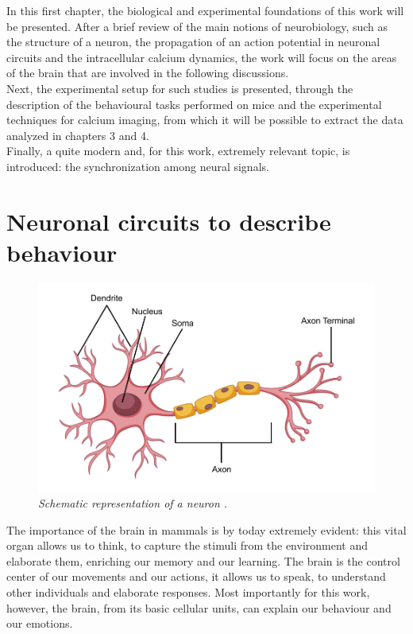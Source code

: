 \documentclass[12pt, a4paper]{report}
\begin{document}
	
	In this first chapter, the biological and experimental foundations of this work will be presented. After a brief review of the main notions of neurobiology, such as the structure of a neuron, the propagation of an action potential in neuronal circuits and the intracellular calcium dynamics, the work will focus on the areas of the brain that are involved in the following discussions.\\
	Next, the experimental setup for such studies is presented, through the description of the behavioural tasks performed on mice and the experimental techniques for calcium imaging, from which it will be possible to extract the data analyzed in chapters 3 and 4.\\
	Finally, a quite modern and, for this work, extremely relevant topic, is introduced: the synchronization among neural signals.
	
	\section{Neuronal circuits to describe behaviour} \label{first section}
	
	\begin{figure}[H]
		\begin{center}
			\includegraphics[scale=.25]{neuron.png} 
		\end{center} 
		\caption{\textit{Schematic representation of a neuron \cite{42}.}} \label{neuron}
		
	\end{figure}
	
	The importance of the brain in mammals is by today extremely evident: this vital organ allows us to think,  to capture the stimuli from the environment and elaborate them, enriching our memory and  our learning. The brain is the control center of our movements and our actions, it allows us to speak, to understand other individuals and elaborate responses. Most importantly for this work, however, the brain, from its basic cellular units, can explain our behaviour and our emotions. \\
\end{document}
